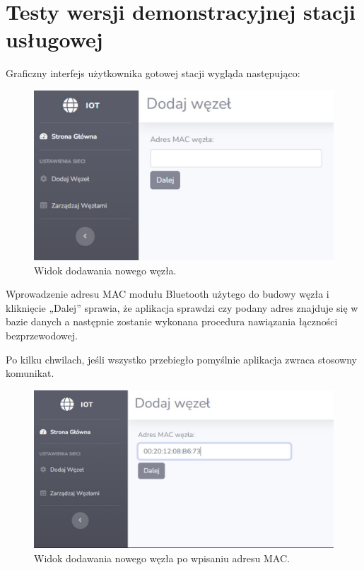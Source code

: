 \documentclass[12pt, twoside, openany]{mwrep}
\begin{document}
\section{Testy wersji demonstracyjnej stacji usługowej}
Graficzny interfejs użytkownika gotowej stacji wygląda następująco:
\begin{figure}[H]
\centering
\includegraphics[scale=0.5]{test1}
\caption{Widok dodawania nowego węzła.}
\end{figure}
\par
Wprowadzenie adresu MAC modułu Bluetooth użytego do budowy węzła i kliknięcie „Dalej” sprawia, że aplikacja sprawdzi czy podany adres znajduje się w bazie danych a następnie zostanie wykonana procedura nawiązania łączności bezprzewodowej.  
\par
Po kilku chwilach, jeśli wszystko przebiegło pomyślnie aplikacja zwraca stosowny komunikat.
\begin{figure}[H]
\centering
\includegraphics[scale=0.5]{test2}
\caption{Widok dodawania nowego węzła po wpisaniu adresu MAC.}
\end{figure}
\end{document}
